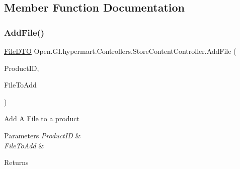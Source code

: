 \subsection{Member Function Documentation}
\hypertarget{class_open_1_1_g_i_1_1hypermart_1_1_controllers_1_1_store_content_controller_a36a438b2ab2cbb1d937b6a4c5bd8b17d}{}\label{class_open_1_1_g_i_1_1hypermart_1_1_controllers_1_1_store_content_controller_a36a438b2ab2cbb1d937b6a4c5bd8b17d} 
\subsubsection{\texorpdfstring{Add\+File()}{AddFile()}}
{\footnotesize\ttfamily \hyperlink{class_open_1_1_g_i_1_1hypermart_1_1_data_transformation_objects_1_1_file_d_t_o}{File\+D\+TO} Open.\+G\+I.\+hypermart.\+Controllers.\+Store\+Content\+Controller.\+Add\+File (\begin{DoxyParamCaption}\item[{int}]{Product\+ID,  }\item[{\hyperlink{class_open_1_1_g_i_1_1hypermart_1_1_models_1_1_file}{Open.\+G\+I.\+hypermart.\+Models.\+File}}]{File\+To\+Add }\end{DoxyParamCaption})}



Add A File to a product 


\begin{DoxyParams}{Parameters}
{\em Product\+ID} & \\
\hline
{\em File\+To\+Add} & \\
\hline
\end{DoxyParams}
\begin{DoxyReturn}{Returns}

\end{DoxyReturn}
\hypertarget{class_open_1_1_g_i_1_1hypermart_1_1_controllers_1_1_store_content_controller_a7c5b861d456ae7b592165634a07c6738}{}\label{class_open_1_1_g_i_1_1hypermart_1_1_controllers_1_1_store_content_controller_a7c5b861d456ae7b592165634a07c6738} 
